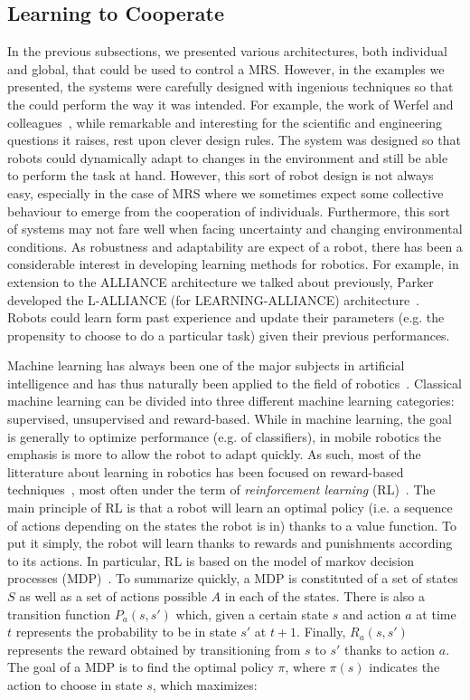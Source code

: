   \subsection{Learning to Cooperate}
  \label{subsection:RL}

    In the previous subsections, we presented various architectures, both individual and global, that could be used to control a MRS. However, in the examples we presented, the systems were carefully designed with ingenious techniques so that the could perform the way it was intended. For example, the work of Werfel and colleagues~\cite{Werfel2014}, while remarkable and interesting for the scientific and engineering questions it raises, rest upon clever design rules. The system was designed so that robots could dynamically adapt to changes in the environment and still be able to perform the task at hand. However, this sort of robot design is not always easy, especially in the case of MRS where we sometimes expect some collective behaviour to emerge from the cooperation of individuals. Furthermore, this sort of systems may not fare well when facing uncertainty and changing environmental conditions. As robustness and adaptability are expect of a robot, there has been a considerable interest in developing learning methods for robotics. For example, in extension to the ALLIANCE architecture we talked about previously, Parker developed the L-ALLIANCE (for LEARNING-ALLIANCE) architecture~\cite{Parker1994}. Robots could learn form past experience and update their parameters (e.g. the propensity to choose to do a particular task) given their previous performances.

    Machine learning has always been one of the major subjects in artificial intelligence and has thus naturally been applied to the field of robotics~\cite{Hertzberg2008}. Classical machine learning can be divided into three different machine learning categories: supervised, unsupervised and reward-based. While in machine learning, the goal is generally to optimize performance (e.g. of classifiers), in mobile robotics the emphasis is more to allow the robot to adapt quickly. As such, most of the litterature about learning in robotics has been focused on reward-based techniques~\cite{Mataric2008}, most often under the term of \emph{reinforcement learning} (RL)~\cite{Sutton1998}. The main principle of RL is that a robot will learn an optimal policy (i.e. a sequence of actions depending on the states the robot is in) thanks to a value function. To put it simply, the robot will learn thanks to rewards and punishments according to its actions. In particular, RL is based on the model of markov decision processes (MDP)~\cite{Bellman1957}. To summarize quickly, a MDP is constituted of a set of states $S$ as well as a set of actions possible $A$ in each of the states. There is also a transition function $P_{a}(s,s')$ which, given a certain state $s$ and action $a$ at time $t$ represents the probability to be in state $s'$ at $t+1$. Finally, $R_{a}(s,s')$ represents the reward obtained by transitioning from $s$ to $s'$ thanks to action $a$. The goal of a MDP is to find the optimal policy $\pi$, where $\pi(s)$ indicates the action to choose in state $s$, which maximizes:

